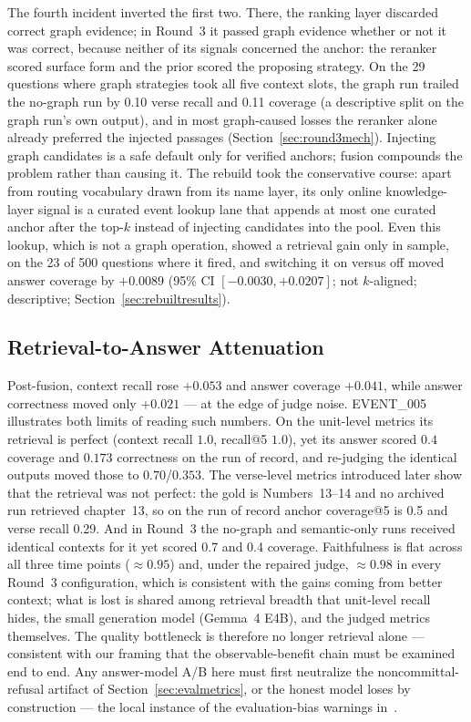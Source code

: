 The fourth incident inverted the first two. There, the ranking layer
discarded correct graph evidence; in Round~3 it passed graph evidence
whether or not it was correct, because neither of its signals concerned
the anchor: the reranker scored surface form and the prior scored the
proposing strategy. On the 29 questions where graph strategies took all
five context slots, the graph run trailed the no-graph run by 0.10
verse recall and 0.11 coverage (a descriptive split on the graph run's
own output), and in most graph-caused losses the reranker alone already
preferred the injected passages (Section~\ref{sec:round3mech}).
Injecting graph candidates is a safe default only for verified anchors;
fusion compounds the problem rather than causing it. The rebuild took
the conservative course: apart from routing vocabulary drawn from its
name layer, its only online knowledge-layer signal is a curated event
lookup lane that appends at most one curated anchor after
the top-$k$ instead of injecting candidates into the pool. Even this
lookup, which is not a graph operation, showed a retrieval gain only in
sample, on the 23 of 500 questions where it fired, and switching it on
versus off moved answer coverage by $+0.0089$ (95\% CI
$[-0.0030, +0.0207]$; not $k$-aligned; descriptive;
Section~\ref{sec:rebuiltresults}).

\subsection{Retrieval-to-Answer Attenuation}

Post-fusion, context recall rose $+0.053$ and answer coverage
$+0.041$, while answer correctness moved only $+0.021$ --- at the edge of
judge noise. EVENT\_005 illustrates both limits of reading such numbers.
On the unit-level metrics its retrieval is perfect (context recall
$1.0$, recall@5 $1.0$), yet its answer scored $0.4$ coverage and $0.173$
correctness on the run of record, and re-judging the identical outputs
moved those to $0.70$/$0.353$. The verse-level metrics introduced later
show that the retrieval was not perfect: the gold is Numbers~13--14 and
no archived run retrieved chapter~13, so on the run of record anchor
coverage@5 is 0.5 and verse recall 0.29. And in Round~3 the no-graph and
semantic-only runs received identical contexts for it yet scored 0.7
and 0.4 coverage. Faithfulness is flat across all three time points
($\approx 0.95$) and, under the repaired judge, $\approx 0.98$ in every
Round~3 configuration, which is consistent with the gains coming from
better context; what is lost is shared among retrieval breadth that
unit-level recall hides, the small generation model (Gemma~4 E4B), and
the judged metrics themselves. The quality bottleneck is therefore no
longer retrieval alone --- consistent with our framing that the
observable-benefit chain must be examined end to end. Any answer-model A/B here must first
neutralize the noncommittal-refusal artifact of
Section~\ref{sec:evalmetrics}, or the honest model loses by
construction --- the local instance of the evaluation-bias warnings
in~\cite{zeng2025unbiased}.

